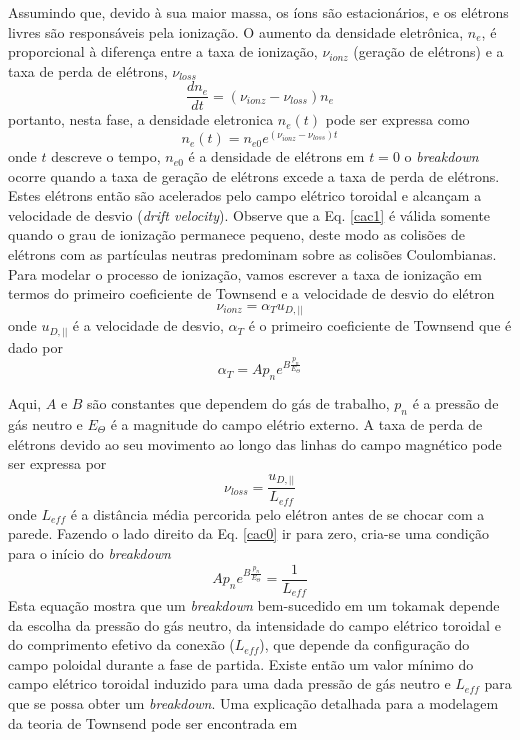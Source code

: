 \documentclass[12pt,oneside,a4paper]{abntex2}
\begin{document}
Assumindo que, devido à sua maior massa, os íons são estacionários, e os elétrons livres são responsáveis pela ionização.  O aumento da densidade eletrônica, $n_e$, é proporcional à diferença entre a taxa de ionização, $\nu_{ionz}$ (geração de elétrons) e a taxa de perda de elétrons, $\nu_{loss}$
\begin{equation}
\dfrac{dn_e}{dt} = (\nu_{ionz}-\nu_{loss})n_e
\label{cac0}
\end{equation}
portanto, nesta fase, a densidade eletronica $n_e(t)$ pode ser expressa como
\begin{equation}
n_e(t) = n_{e0} e^{(\nu_{ionz}-\nu_{loss})t}
\label{cac1}
\end{equation}
onde $t$ descreve o tempo, $n_{e0}$ é a densidade de elétrons em $t=0$ o \textit{breakdown} ocorre quando a taxa de geração de elétrons excede a taxa de perda de elétrons. Estes elétrons então são acelerados pelo campo elétrico toroidal e alcançam a velocidade de desvio (\textit{drift velocity}). Observe que a Eq. \ref{cac1} é válida somente quando o grau de ionização permanece pequeno, deste modo as colisões de elétrons com as partículas neutras predominam sobre as colisões Coulombianas. Para modelar o processo de ionização, vamos escrever a taxa de ionização em termos do primeiro coeficiente de Townsend e a velocidade de desvio do elétron 
\begin{equation}
\nu_{ionz} = \alpha_T u_{D,||}
\end{equation} 
onde $u_{D, ||}$ é a velocidade de desvio, $\alpha_T$ é o primeiro coeficiente de Townsend que é dado por
\begin{equation}
\alpha_T = A p_n e^{B \frac{p_n}{E_\Theta}}
\end{equation}

Aqui, $A$ e $B$ são constantes que dependem do gás de trabalho, $p_n$ é a pressão de gás neutro e  $E_\Theta$ é a magnitude do campo elétrio externo. A taxa de perda de elétrons devido ao seu movimento ao longo das linhas do campo magnético pode ser expressa por
\begin{equation}
\nu_{loss} = \frac{u_{D,||}}{L_{eff}}
\end{equation}
onde $L_{eff}$ é a distância média percorida pelo elétron antes de se chocar com a parede. Fazendo o lado direito da Eq. \ref{cac0} ir para zero, cria-se uma condição para o início do \textit{breakdown}
\begin{equation}
A p_n e^{B \frac{p_n}{E_\Theta}} = \frac{1}{L_{eff}}
\end{equation}
Esta equação mostra que um \textit{breakdown} bem-sucedido em um tokamak depende da escolha da pressão do gás neutro, da intensidade do campo elétrico toroidal e do comprimento efetivo da conexão ($L_{eff}$), que depende da configuração do campo poloidal durante a fase de partida. Existe então um valor mínimo do campo elétrico toroidal induzido para uma dada pressão de gás neutro e $L_{eff}$ para que se possa obter um \textit{breakdown}. Uma explicação detalhada para a modelagem da teoria de Townsend pode ser encontrada em \cite{yoo2014ohmic}
 
\end{document}
